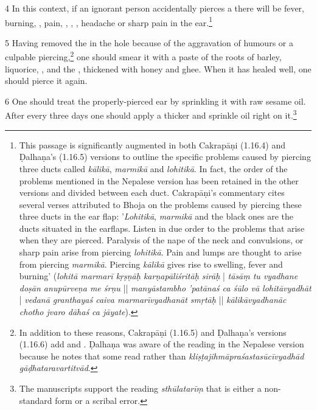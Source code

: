\begin{translation}
    \item [4] In this context, if an ignorant person accidentally pierces a 
     there will 
    be fever, burning, , pain, , 
    , 
    , headache or sharp pain in the ear.\footnote{This passage is significantly augmented in both Cakrapāṇi (1.16.4) and Ḍalhaṇa's (1.16.5) versions to outline the specific problems caused by piercing three ducts called \emph{kālikā}, \emph{marmikā} and \emph{lohitikā}. In fact, the order of the problems mentioned in the Nepalese version has been retained in the other versions and divided between each duct. Cakrapāṇi's commentary cites several verses attributed to Bhoja on the problems caused by piercing these three ducts in the ear flap: '\emph{Lohitikā}, \emph{marmikā} and the black ones are the ducts situated in the earflaps.  Listen in due order to the problems that arise when they are pierced. Paralysis of the nape of the neck and convulsions, or sharp pain arise from piercing \emph{lohitikā}. Pain and lumps are thought to arise from piercing \emph{marmikā}. Piercing \emph{kālikā} gives rise to swelling, fever and burning' (\emph{lohitā marmarī kṛṣṇāḥ karṇapāliśritāḥ sirāḥ} | \emph{tāsāṃ tu vyadhane doṣān anupūrveṇa me śrṇu} || \emph{manyāstambho 'patānaś ca śūlo vā lohitāvyadhāt} | \emph{vedanā granthayaś caiva marmarīvyadhanāt smṛtāḥ} || \emph{kālikāvyadhanāc chotho jvaro dāhaś ca jāyate}).}
    
    \item[5]     Having removed the  in the hole because of the aggravation of humours or a culpable piercing,\footnote{In addition to these reasons, Cakrapāṇi (1.16.5) and Ḍalhaṇa's versions (1.16.6) add  and . Ḍalhaṇa was aware of the reading in the Nepalese version because he notes that some read  rather than \emph{kliṣṭajihmāpraśastasūcīvyadhād gāḍhatara\-vartitvād}.} one should smear it with
    a paste of the roots of 
    barley, 
    liquorice, 
    , and the
    ,
    thickened with honey and ghee. When it has healed well, one should pierce it again.
    
    \item[6] One should treat the properly-pierced ear by sprinkling it with raw sesame
    oil.   After every three days one should apply a thicker  and
    sprinkle oil right on it.\footnote{The manuscripts support the reading
    \emph{sthūlatarīṃ} that is either a non-standard form or a scribal error.}
    

\end{translation}
